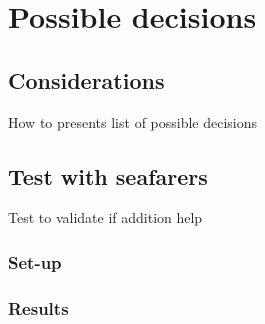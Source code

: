 \chapter{Possible decisions}

\section{Considerations}
How to presents list of possible decisions

\section{Test with seafarers}
Test to validate if addition help

\subsection{Set-up}

\subsection{Results}


